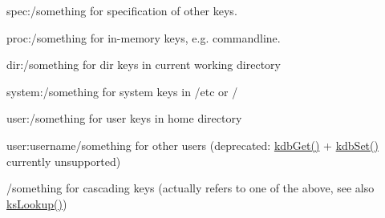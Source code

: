\begin{DoxyItemize}
\item {\ttfamily spec\+:/something} for specification of other keys.
\item {\ttfamily proc\+:/something} for in-\/memory keys, e.\+g. commandline.
\item {\ttfamily dir\+:/something} for dir keys in current working directory
\item {\ttfamily system\+:/something} for system keys in /etc or /
\item {\ttfamily user\+:/something} for user keys in home directory
\item {\ttfamily user\+:username/something} for other users (deprecated\+: \hyperlink{group__kdb_ga28e385fd9cb7ccfe0b2f1ed2f62453a1}{kdb\+Get()} + \hyperlink{group__kdb_ga11436b058408f83d303ca5e996832bcf}{kdb\+Set()} currently unsupported)
\item {\ttfamily /something} for cascading keys (actually refers to one of the above, see also \hyperlink{group__keyset_ga60f1ddcf23272f2b29b90e92ebe9b56f}{ks\+Lookup()})


\end{DoxyItemize}
